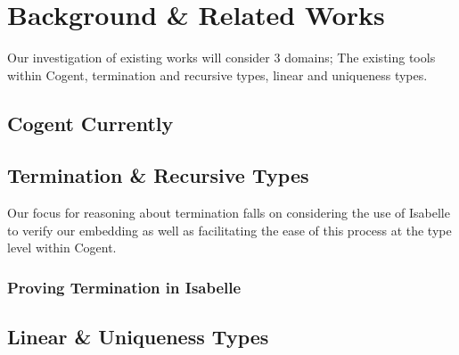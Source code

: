 \chapter{Background \& Related Works}\label{ch:background}

Our investigation of existing works will consider 3 domains; The existing tools within Cogent,
termination and recursive types, linear and uniqueness types.

\section{Cogent Currently}

\section{Termination \& Recursive Types}

Our focus for reasoning about termination falls on considering the use of Isabelle to verify our 
embedding as well as facilitating the ease of this process at the type level within Cogent. 

\subsection{Proving Termination in Isabelle}


\section{Linear \& Uniqueness Types}
